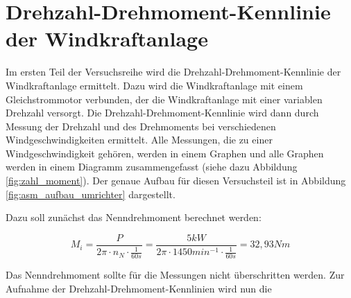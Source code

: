 \documentclass{report}
\begin{document}
\section{Drehzahl-Drehmoment-Kennlinie der Windkraftanlage}

Im ersten Teil der Versuchsreihe wird die Drehzahl-Drehmoment-Kennlinie der Windkraftanlage ermittelt. Dazu wird die Windkraftanlage mit einem Gleichstrommotor verbunden, der die Windkraftanlage mit einer variablen Drehzahl versorgt. Die Drehzahl-Drehmoment-Kennlinie wird dann durch Messung der Drehzahl und des Drehmoments bei verschiedenen Windgeschwindigkeiten ermittelt. Alle Messungen, die zu einer Windgeschwindigkeit gehören, werden in einem Graphen und alle Graphen werden in einem Diagramm zusammengefasst (siehe dazu Abbildung \ref{fig:zahl_moment}). Der genaue Aufbau für diesen Versuchsteil ist in Abbildung \ref{fig:asm_aufbau_umrichter} dargestellt.

Dazu soll zunächst das Nenndrehmoment berechnet werden:

\begin{equation}
	\label{eq:1}
	M_{i} = \frac{P}{2\pi\cdot n_{N}\cdot \frac{1}{60s}} = \frac{5kW}{2\pi \cdot 1450min^{-1} \cdot \frac{1}{60s}} = 32,93Nm
\end{equation}

Das Nenndrehmoment sollte für die Messungen nicht überschritten werden. Zur Aufnahme der Drehzahl-Drehmoment-Kennlinien wird nun die
\end{document}
